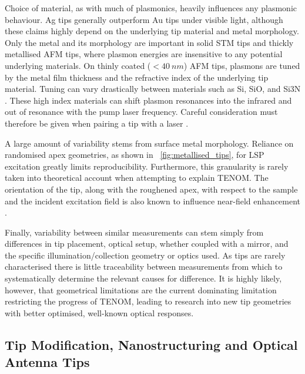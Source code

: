\documentclass{article}
\begin{document}
Choice of material, as with much of plasmonics, heavily influences any plasmonic behaviour. Ag tips generally outperform Au tips under visible light, although these claims highly depend on the underlying tip material and metal morphology. Only the metal and its morphology are important in solid STM tips and thickly metallised AFM tips, where plasmon energies are insensitive to any potential underlying materials. On thinly coated ($<\SI{40}{nm}$) AFM tips, plasmons are tuned by the metal film thickness \cite{huber2014} and the refractive index of the underlying tip material. Tuning can vary drastically between materials such as Si, SiO, and Si\subs3N \cite{picardi2007, taguchi2009}. These high index materials can shift plasmon resonances into the infrared and out of resonance with the pump laser frequency. Careful consideration must therefore be given when pairing a tip with a laser \cite{yeo2006, yeo2007, cui2007, hayazawa2012}.

A large amount of variability stems from surface metal morphology. Reliance on randomised apex geometries, as shown in \figurename~\ref{fig:metallised_tips}, for LSP excitation greatly limits reproducibility. Furthermore, this granularity is rarely taken into theoretical account when attempting to explain TENOM. The orientation of the tip, along with the roughened apex, with respect to the sample and the incident excitation field is also known to influence near-field enhancement \cite{yeo2006, mino2014}.

Finally, variability between similar measurements can stem simply from differences in tip placement, optical setup, whether coupled with a mirror, and the specific illumination/collection geometry or optics used. As tips are rarely characterised there is little traceability between measurements from which to systematically determine the relevant causes for difference. It is highly likely, however, that geometrical limitations are the current dominating limitation restricting the progress of TENOM, leading to research into new tip geometries with better optimised, well-known optical responses.

\subsection{Tip Modification, Nanostructuring and Optical Antenna Tips}
\end{document}
